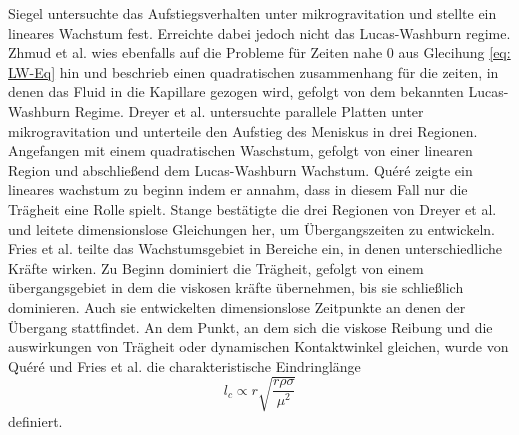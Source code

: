 Siegel \cite{siegel1961TransientCapillaryRise} untersuchte das Aufstiegsverhalten unter mikrogravitation und stellte ein lineares Wachstum fest. Erreichte dabei jedoch nicht das Lucas-Washburn regime. Zhmud et al. \cite{zhmud2000DynamicsCapillaryRise} wies ebenfalls auf die Probleme für Zeiten nahe $0$ aus Glecihung \ref{eq: LW-Eq} hin und beschrieb einen quadratischen zusammenhang für die zeiten, in denen das Fluid in die Kapillare gezogen wird, gefolgt von dem bekannten Lucas-Washburn Regime.
Dreyer et al. \cite{dreyer1994CapillaryRiseLiquid} untersuchte parallele Platten unter mikrogravitation und unterteile den Aufstieg des Meniskus in drei Regionen. Angefangen mit einem quadratischen Waschstum, gefolgt von einer linearen Region und abschließend dem Lucas-Washburn Wachstum. Quéré \cite{quere1997InertialCapillarity} zeigte ein lineares wachstum zu beginn indem er annahm, dass in diesem Fall nur die Trägheit eine Rolle spielt. Stange \cite{stange2003CapillaryDrivenFlow} bestätigte die drei Regionen von Dreyer et al. \cite{dreyer1994CapillaryRiseLiquid} und leitete dimensionslose Gleichungen her, um Übergangszeiten zu entwickeln. 
Fries et al. \cite{fries2008TransitionInertialViscous} teilte das Wachstumsgebiet in Bereiche ein, in denen unterschiedliche Kräfte wirken. Zu Beginn dominiert die Trägheit, gefolgt von einem übergangsgebiet in dem die viskosen kräfte übernehmen, bis sie schließlich dominieren. Auch sie entwickelten dimensionslose Zeitpunkte an denen der Übergang stattfindet. 
An dem Punkt, an dem sich die viskose Reibung und die auswirkungen von Trägheit oder dynamischen Kontaktwinkel gleichen, wurde von Quéré \cite{quere1997InertialCapillarity} und Fries et al. \cite{fries2008TransitionInertialViscous} die charakteristische Eindringlänge
\begin{equation}
    \label{eq: charLength}
    l_c \propto r \sqrt{\frac{r\rho \sigma}{\mu^2}}
\end{equation}
definiert. 



